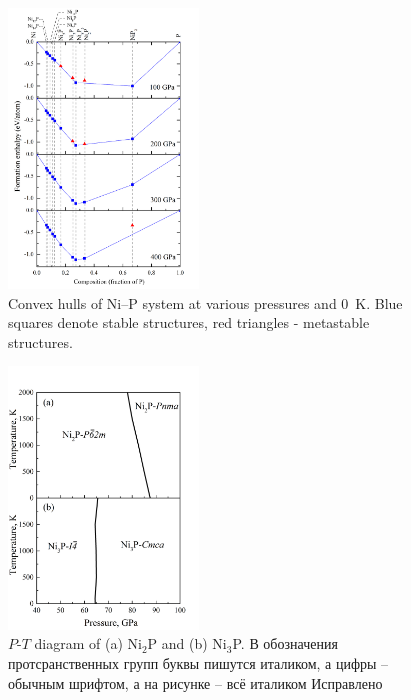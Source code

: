 \documentclass[twoside,twocolumn,9pt]{article}
\begin{document}
\begin{figure}[h]
 \centering
 \includegraphics[width=0.45\textwidth]{convex_hull-2.png} %
 \caption{Convex hulls of Ni--P system at various pressures and 0~K. Blue squares denote stable structures, red triangles - metastable structures.}
 \label{fgr:convex_hull}
\end{figure}


\begin{figure}[h]
\centering
  \includegraphics[width=0.45\textwidth]{PT-Ni2P-Ni3P.jpg}
  \caption{$P$-$T$ diagram of (a) Ni$_2$P and (b) Ni$_3$P. {\color{red}В обозначения протсранственных групп буквы пишутся италиком, а цифры – обычным шрифтом, а на рисунке – всё италиком} {\color{blue} Исправлено}}
  \label{fgr:PT-Ni2P-Ni3P}
\end{figure}

\end{document}
